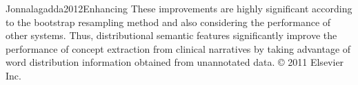\begin{review}{Jonnalagadda2012Enhancing}
{				These improvements are highly significant according to the bootstrap resampling method and also considering the performance of other systems. 
				Thus, distributional semantic features significantly improve the performance of concept extraction from clinical narratives by taking advantage of word distribution information obtained from unannotated data. 
				© 2011 Elsevier Inc.
			}
	
\end{review}
